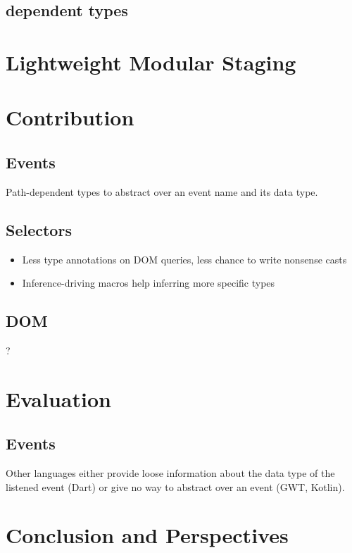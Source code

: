 \documentclass[runningheads,a4paper]{llncs}
\begin{document}
\subsection{dependent types}

\section{Lightweight Modular Staging}

\section{Contribution}

\subsection{Events}

Path-dependent types to abstract over an event name and its data type.

\subsection{Selectors}

\begin{itemize}
 \item Less type annotations on DOM queries, less chance to write nonsense casts
 \item Inference-driving macros help inferring more specific types
\end{itemize}

\subsection{DOM}

?

\section{Evaluation}

\subsection{Events}

Other languages either provide loose information about the data type of the listened event (Dart) or give no way to
abstract over an event (GWT, Kotlin).

\section{Conclusion and Perspectives}




\end{document}
